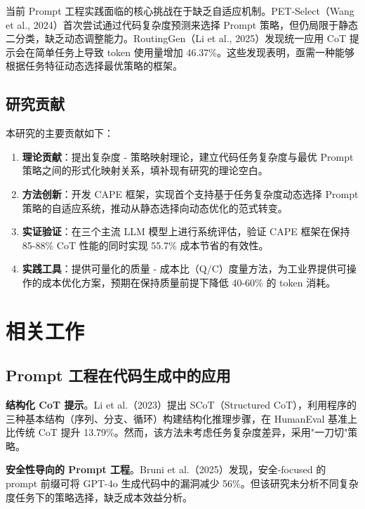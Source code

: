 \documentclass[11pt,a4paper]{article}
\begin{document}
当前 Prompt 工程实践面临的核心挑战在于缺乏自适应机制。PET-Select（Wang et al., 2024）首次尝试通过代码复杂度预测来选择 Prompt 策略，但仍局限于静态二分类，缺乏动态调整能力。RoutingGen（Li et al., 2025）发现统一应用 CoT 提示会在简单任务上导致 token 使用量增加 46.37\%。这些发现表明，亟需一种能够根据任务特征动态选择最优策略的框架。

\subsection{研究贡献}

本研究的主要贡献如下：

\begin{enumerate}[leftmargin=*]
    \item \textbf{理论贡献}：提出复杂度 - 策略映射理论，建立代码任务复杂度与最优 Prompt 策略之间的形式化映射关系，填补现有研究的理论空白。
    
    \item \textbf{方法创新}：开发 CAPE 框架，实现首个支持基于任务复杂度动态选择 Prompt 策略的自适应系统，推动从静态选择向动态优化的范式转变。
    
    \item \textbf{实证验证}：在三个主流 LLM 模型上进行系统评估，验证 CAPE 框架在保持 85-88\% CoT 性能的同时实现 55.7\% 成本节省的有效性。
    
    \item \textbf{实践工具}：提供可量化的质量 - 成本比（Q/C）度量方法，为工业界提供可操作的成本优化方案，预期在保持质量前提下降低 40-60\% 的 token 消耗。
\end{enumerate}

\section{相关工作}

\subsection{Prompt 工程在代码生成中的应用}

\textbf{结构化 CoT 提示}。Li et al.（2023）提出 SCoT（Structured CoT），利用程序的三种基本结构（序列、分支、循环）构建结构化推理步骤，在 HumanEval 基准上比传统 CoT 提升 13.79\%。然而，该方法未考虑任务复杂度差异，采用"一刀切"策略。

\textbf{安全性导向的 Prompt 工程}。Bruni et al.（2025）发现，安全-focused 的 prompt 前缀可将 GPT-4o 生成代码中的漏洞减少 56\%。但该研究未分析不同复杂度任务下的策略选择，缺乏成本效益分析。
\end{document}
